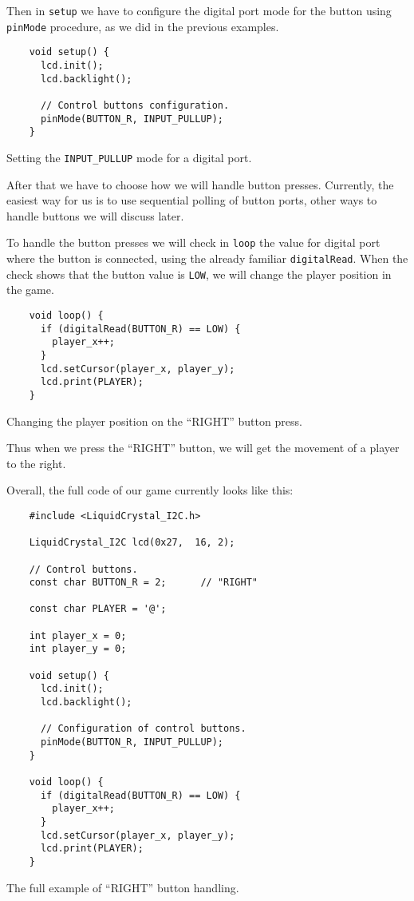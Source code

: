 \documentclass[../sparc.tex]{subfiles}
\begin{document}
Then in \texttt{setup} we have to configure the digital port mode for
the button using \texttt{pinMode} procedure, as we did in the previous
examples.

\begin{listing}[H]
  \begin{verbatim}
    void setup() {
      lcd.init();
      lcd.backlight();

      // Control buttons configuration.
      pinMode(BUTTON_R, INPUT_PULLUP);
    }
  \end{verbatim}
  \caption{Setting the \texttt{INPUT_PULLUP} mode for a digital port.}
  \label{listing:game-dev-input-pullup-mode}
\end{listing}

After that we have to choose how we will handle button presses.  Currently, the
easiest way for us is to use sequential polling of button ports, other ways to
handle buttons we will discuss later.

To handle the button presses we will check in \texttt{loop} the value
for digital port where the button is connected, using the already familiar
\texttt{digitalRead}.  When the check shows that the button value is
\texttt{LOW}, we will change the player position in the game.

\begin{listing}[H]
  \begin{verbatim}
    void loop() {
      if (digitalRead(BUTTON_R) == LOW) {
        player_x++;
      }
      lcd.setCursor(player_x, player_y);
      lcd.print(PLAYER);
    }
  \end{verbatim}
  \caption{Changing the player position on the ``RIGHT'' button press.}
  \label{listing:game-dev-button-right}
\end{listing}

Thus when we press the ``RIGHT'' button, we will get the movement of a player to
the right.

Overall, the full code of our game currently looks like this:

\begin{listing}[H]
  \begin{verbatim}
    #include <LiquidCrystal_I2C.h>

    LiquidCrystal_I2C lcd(0x27,  16, 2);

    // Control buttons.
    const char BUTTON_R = 2;      // "RIGHT"

    const char PLAYER = '@';

    int player_x = 0;
    int player_y = 0;

    void setup() {
      lcd.init();
      lcd.backlight();

      // Configuration of control buttons.
      pinMode(BUTTON_R, INPUT_PULLUP);
    }

    void loop() {
      if (digitalRead(BUTTON_R) == LOW) {
        player_x++;
      }
      lcd.setCursor(player_x, player_y);
      lcd.print(PLAYER);
    }
  \end{verbatim}
  \caption{The full example of ``RIGHT'' button handling.}
  \label{listing:game-dev-button-right-full-example}
\end{listing}
\end{document}
